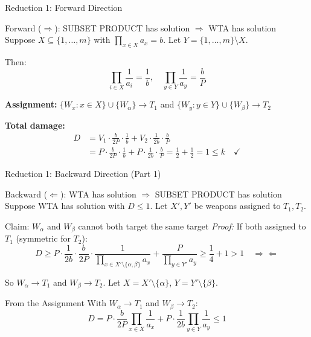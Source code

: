 \documentclass[aspectratio=43,8pt]{beamer}
\begin{document}
\begin{frame}{Reduction 1: Forward Direction}
\begin{block}{Forward ($\Rightarrow$): SUBSET PRODUCT has solution $\Rightarrow$ WTA has solution}
Suppose $X \subseteq \{1, \ldots, m\}$ with $\prod_{x \in X} a_x = b$. Let $Y = \{1, \ldots, m\} \setminus X$.

Then:
$$\prod_{i \in X} \frac{1}{a_i} = \frac{1}{b}, \quad \prod_{y \in Y} \frac{1}{a_y} = \frac{b}{P}$$

\textbf{Assignment:} $\{W_x : x \in X\} \cup \{W_\alpha\} \rightarrow T_1$ and $\{W_y : y \in Y\} \cup \{W_\beta\} \rightarrow T_2$

\textbf{Total damage:}
\begin{align*}
D &= V_1 \cdot \frac{b}{2P} \cdot \frac{1}{b} + V_2 \cdot \frac{1}{2b} \cdot \frac{b}{P} \\
&= P \cdot \frac{b}{2P} \cdot \frac{1}{b} + P \cdot \frac{1}{2b} \cdot \frac{b}{P} = \frac{1}{2} + \frac{1}{2} = 1 \leq k \quad \checkmark
\end{align*}
\end{block}
\end{frame}

\begin{frame}{Reduction 1: Backward Direction (Part 1)}
\begin{block}{Backward ($\Leftarrow$): WTA has solution $\Rightarrow$ SUBSET PRODUCT has solution}
Suppose WTA has solution with $D \leq 1$. Let $X', Y'$ be weapons assigned to $T_1, T_2$.
\end{block}

\begin{alertblock}{Claim: $W_\alpha$ and $W_\beta$ cannot both target the same target}
\textit{Proof:} If both assigned to $T_1$ (symmetric for $T_2$):
$$D \geq P \cdot \frac{1}{2b} \cdot \frac{b}{2P} \cdot \frac{1}{\prod_{x \in X' \setminus \{\alpha, \beta\}} a_x} + \frac{P}{\prod_{y \in Y'} a_y} \geq \frac{1}{4} + 1 > 1 \quad \Rightarrow\!\Leftarrow$$

So $W_\alpha \to T_1$ and $W_\beta \to T_2$. Let $X = X' \setminus \{\alpha\}$, $Y = Y' \setminus \{\beta\}$.
\end{alertblock}

\begin{block}{From the Assignment}
With $W_\alpha \to T_1$ and $W_\beta \to T_2$:
$$D = P \cdot \frac{b}{2P} \prod_{x \in X} \frac{1}{a_x} + P \cdot \frac{1}{2b} \prod_{y \in Y} \frac{1}{a_y} \leq 1$$
\end{block}

\end{frame}
\end{document}
